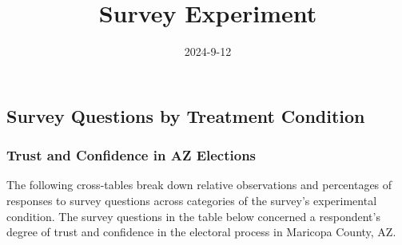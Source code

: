 \documentclass[
  11pt,
  a4paper,
]{article}
\title{Survey Experiment}
\date{2024-9-12}
\author{\sf{\Large\textbf{Isaiah} \\[0.5cm]}}
\makeatletter
\def\maketitle{\front{\expandafter{\@title}}{\@author}{\@organization}}
\makeatother
\begin{document}
\maketitle


\subsection{Survey Questions by Treatment
Condition}\label{survey-questions-by-treatment-condition}

\subsubsection{Trust and Confidence in AZ
Elections}\label{trust-and-confidence-in-az-elections}

The following cross-tables break down relative observations and
percentages of responses to survey questions across categories of the
survey's experimental condition. The survey questions in the table below
concerned a respondent's degree of trust and confidence in the electoral
process in Maricopa County, AZ.
\end{document}
